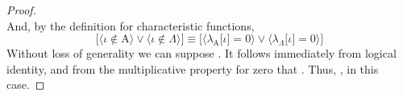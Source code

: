 \documentclass[preview]{standalone}
\begin{document}
\begin{proof}
\begin{equation*}
    \end{equation*}
    And, by the definition for characteristic functions,
    \begin{equation*}
        \bigg[
            \Big \langle \iota \notin \mathrm{A} \Big \rangle
                \lor
            \Big \langle \iota \notin \Lambda \Big \rangle
        \bigg]
            \equiv
        \bigg[
            \Big \langle \lambda_{\mathrm{A}} \big[ \iota \big] = 0 \Big \rangle 
                \lor 
            \Big \langle \lambda_{\Lambda} \big[ \iota \big] = 0 \Big \rangle
        \bigg]
    \end{equation*}
    Without loss of generality we can suppose 
    . 
    It follows immediately from logical identity, 
    and from the multiplicative property for zero that 
    . 
    Thus, 
    , in this case.
\color{lightgray} \end{proof}
\end{document}
